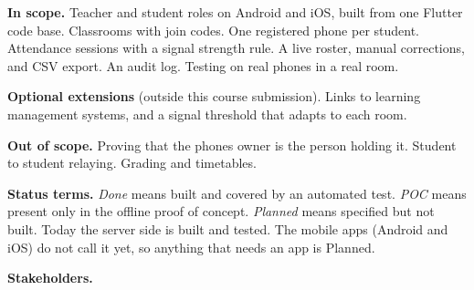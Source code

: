 \textbf{In scope.} Teacher and student roles on Android and iOS, built from one Flutter code base. Classrooms with join codes. One registered phone per student. Attendance sessions with a signal strength rule. A live roster, manual corrections, and CSV export. An audit log. Testing on real phones in a real room.

\textbf{Optional extensions} (outside this course submission). Links to learning management systems, and a signal threshold that adapts to each room.

\textbf{Out of scope.} Proving that the phone\textquotesingle s owner is the person holding it. Student to student relaying. Grading and timetables.

\textbf{Status terms.} \emph{Done} means built and covered by an automated test. \emph{POC} means present only in the offline proof of concept. \emph{Planned} means specified but not built. Today the server side is built and tested. The mobile apps (Android and iOS) do not call it yet, so anything that needs an app is Planned.

\textbf{Stakeholders.}

